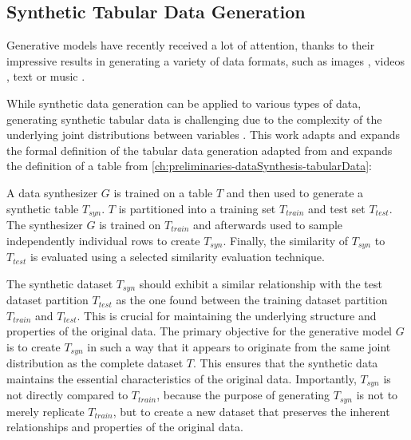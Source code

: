 \subsection{Synthetic Tabular Data Generation}
\label{sec: synthetic tabular data generation}

Generative models have recently received a lot of attention, thanks to their impressive results in generating a variety of data formats, 
such as images \cite{ho2020DenoisingDiffusionProbabilistic, dhariwal2021DiffusionModelsBeat, rombach2022HighResolutionImageSynthesis}, videos \cite{ho2022VideoDiffusionModels, runwayGen1Runway}, text \cite{radfordImprovingLanguageUnderstanding, openai2022ChatGPTOptimizingLanguage} or music \cite{agostinelli2023MusicLMGeneratingMusic, Forsgren_Martiros_2022}.

While synthetic data generation can be applied to various types of data, generating synthetic tabular data is challenging due to the complexity of the underlying joint distributions between variables \cite{borisov2022DeepNeuralNetworks}.
This work adapts and expands the formal definition of the tabular data generation adapted from \cite[p. 2]{xu2019ModelingTabularData} and expands the definition of a table from \autoref{ch:preliminaries-dataSynthesis-tabularData}:

\begin{displayquote}
    A data synthesizer $G$ is trained on a table $T$ and then used to generate a synthetic table $T_{syn}$. %
    $T$ is partitioned into a training set $T_{train}$ and test set $T_{test}$. 
    The synthesizer $G$ is trained on $T_{train}$ and afterwards used to sample independently individual rows to create $T_{syn}$.
    Finally, the similarity of $T_{syn}$ to $T_{test}$ is evaluated using a selected similarity evaluation technique.
\end{displayquote}

The synthetic dataset $T_{syn}$ should exhibit a similar relationship with the test dataset partition $T_{test}$ 
as the one found between the training dataset partition $T_{train}$ and $T_{test}$. 
This is crucial for maintaining the underlying structure and properties of the original data.
The primary objective for the generative model $G$ is to create $T_{syn}$ in such a way that it appears to originate from the same joint distribution as the complete dataset $T$. 
This ensures that the synthetic data maintains the essential characteristics of the original data.
Importantly, $T_{syn}$ is not directly compared to $T_{train}$, because the purpose of generating $T_{syn}$ is not to merely replicate $T_{train}$,
but to create a new dataset that preserves the inherent relationships and properties of the original data.

